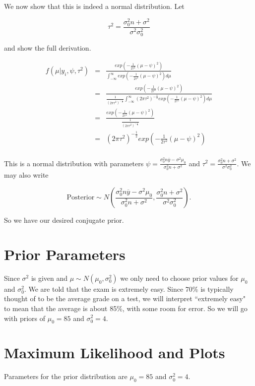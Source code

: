 \documentclass[12pt]{article}
\newcommand{\ybar}{\overline{y}}
\begin{document}
\noindent We now show that this is indeed a normal distribution.  Let

\[\tau^2=\frac{\sigma_0^2n+\sigma^2}{\sigma^2\sigma_0^2}\]

\noindent and show the full derivation.

\begin{eqnarray*}
f(\mu|y_i,\psi,\tau^2) &=& \frac{exp(-\frac{1}{2\tau^2}(\mu-\psi)^2)}{\int_{-\infty}^\infty exp(-\frac{1}{2\tau^2}(\mu-\psi)^2)d\mu} \\
&=& \frac{exp(-\frac{1}{2\tau^2}(\mu-\psi)^2)}{\frac{1}{(2\pi\tau^2)^{-\frac{1}{2}}}\int_{-\infty}^\infty(2\pi\tau^2)^{-\frac{1}{2}}exp(-\frac{1}{2\tau^2}(\mu-\psi)^2)d\mu} \\
&=& \frac{exp(-\frac{1}{2\tau^2}(\mu-\psi)^2)}{\frac{1}{(2\pi\tau^2)^{-\frac{1}{2}}}} \\
&=& (2\pi\tau^2)^{-\frac{1}{2}}exp\left(-\frac{1}{2\tau^2}(\mu-\psi)^2\right) \\
\end{eqnarray*}

\noindent This is a normal distribution with parameters $\psi=\frac{\sigma_0^2n\ybar-\sigma^2\mu_0}{\sigma_0^2n+\sigma^2}$ and $\tau^2=\frac{\sigma_0^2n+\sigma^2}{\sigma^2\sigma_0^2}$.  We may also write

\[\mathrm{Posterior}\sim N\left(\frac{\sigma_0^2n\ybar-\sigma^2\mu_0}{\sigma_0^2n+\sigma^2},\frac{\sigma_0^2n+\sigma^2}{\sigma^2\sigma_0^2}\right).\]

\noindent So we have our desired conjugate prior.

\section*{Prior Parameters}

\noindent Since $\sigma^2$ is given and $\mu\sim N(\mu_0,\sigma_0^2)$ we only need to choose prior values for $\mu_0$ and $\sigma_0^2$.  We are told that the exam is extremely easy.  Since 70\% is typically thought of to be the average grade on a test, we will interpret ``extremely easy" to mean that the average is about 85\%, with some room for error.  So we will go with priors of $\mu_0=85$ and $\sigma_0^2=4$.
\bigskip

\section*{Maximum Likelihood and Plots}

\noindent Parameters for the prior distribution are $\mu_0=85$ and $\sigma_0^2=4$. \\ [-.8cm]
\end{document}
